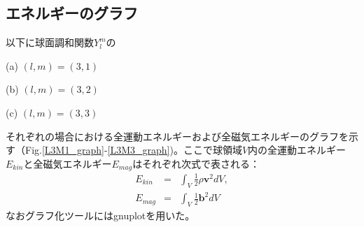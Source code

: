 \documentclass[12pt]{jsarticle}
\begin{document}
\subsection{エネルギーのグラフ}
以下に球面調和関数$Y_l^m$の
\begin{description}
\item{(a)} $(l,m)=(3,1)$
\item{(b)} $(l,m)=(3,2)$
\item{(c)} $(l,m)=(3,3)$
\end{description}
それぞれの場合における全運動エネルギーおよび全磁気エネルギーのグラフを示す（Fig.\ref{L3M1_graph}-\ref{L3M3_graph})。ここで球領域$V$内の全運動エネルギー$E_{kin}$と全磁気エネルギー$E_{mag}$はそれぞれ次式で表される：
\begin{eqnarray}
E_{kin} &=& \int_V \frac{1}{2} \rho \bm v^2 dV, \\
E_{mag} &=& \int_V \frac{1}{2} \bm b^2 dV
\end{eqnarray}
なおグラフ化ツールにはgnuplotを用いた。
\end{document}
